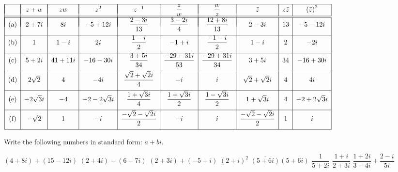 \begin{Answer}\phantom{} \newline
    \vspace{-0.6cm} \begin{small} $\renewcommand{\arraystretch}{1.15}\begin{array}{|c|c|c|c|c|c|c|c|c|c|}			\hline
			&&&&&&\vspace{-0.5cm}\\
			& z+w & zw & z^2 & z^{-1} &\dfrac{z}{w} & \dfrac{w}{z} & \bar{z} & z\bar{z} & \left(\bar{z}\right)^2 \\
			&&&&&&\vspace{-0.5cm}\\
			\hline
			\hline
			&&&&&&\vspace{-0.5cm}\\
			\mbox{(a)}  & 2+7i & 8i  & -5+12i&  \dfrac{2-3i}{13} & \dfrac{3-2i}{4} & \dfrac{12+8i}{13}  & 2-3i & 13 & -5-12i \\[0.3cm]
			\hline 
			\mbox{(b)} & 1 & 1-i & 2i & \dfrac{1-i}{2}& -1+i & \dfrac{-1-i}{2} & 1-i & 2 &-2i \\[0.3cm]
			\hline
			\mbox{(c)} & 5+2i & 41+11i & -16-30i & \dfrac{3+5i}{34} & \dfrac{-29-31i}{53} & \dfrac{-29+31i}{34} & 3+5i & 34 & -16+30i \\[0.3cm]
			\hline
			\mbox{(d)} & 2\sqrt{2} & 4 &  -4i  & \dfrac{\sqrt{2}+\sqrt{2}i}{4} & -i & i & \sqrt{2}+\sqrt{2}i & 4 & 4i \\[0.3cm]
			\hline
			\mbox{(e)} & -2\sqrt{3}i & -4 &  -2-2\sqrt{3}i  & \dfrac{1+\sqrt{3}i}{4} & \dfrac{1+\sqrt{3}i}{2} & \dfrac{1-\sqrt{3}i}{2} & 1+\sqrt{3}i & 4 & -2+2\sqrt{3}i \\[0.3cm]
			\hline
			\mbox{(f)} & -\sqrt{2} & 1 &  -i  & \dfrac{-\sqrt{2}-\sqrt{2}i}{2} & -i & i & \dfrac{-\sqrt{2}-\sqrt{2}i}{2} & 1 & i \\[0.3cm]
			\hline
			\end{array}$
		\end{small}
\end{Answer}


\begin{Exercise} Write the following numbers in standard form: $a+bi$.
    \begin{multicols}{2}
    	\Question[difficulty = 1] $(4+8i)+(15-12i)$
    	\Question[difficulty = 1] $(2+4i)-(6-7i)$
    	\Question[difficulty = 1] $(2+3i)+(-5+i)$
    	\Question[difficulty = 1] $(2+i)^2$
    	\Question[difficulty = 1] $\overline{(5+6i)}(5+6i)$
    	\Question[difficulty = 1] $\dfrac{1}{5+2i}$
    	\Question[difficulty = 1] $\dfrac{1+i}{2+3i}$
    	\ifanalysis\Question[difficulty = 1]\fi \ifcalculus\Question[difficulty = 2]\fi $\dfrac{1+2i}{3-4i} + \dfrac{2-i}{5i}$	
    	\EndCurrentQuestion
	\end{multicols}
\end{Exercise}


